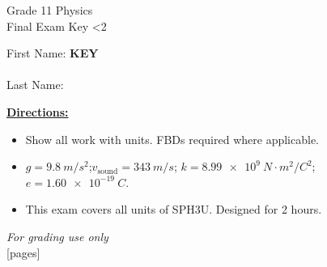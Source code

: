 \documentclass[addpoints]{exam}
\newcommand{\event}{Final Exam}
\newcommand{\tournament}{}
\def\type{0}
\begin{document}
\begin{center}
    {\huge Grade 11 Physics \\ \event
    \ifprintanswers \space Key
    \else \space \ifnum\type<2 \fi
    \fi \\ \vspace{3mm}\tournament\vspace{1mm}}
\end{center}

\vspace{.20\textheight}

\begin{center}
    First Name: \ifprintanswers
    \underline{\hspace{3.5cm}}\textbf{KEY}\underline{\hspace{5.5cm}}\\\vspace{5mm}
    \else \underline{\hspace{10cm}}\\ \vspace{5mm} \fi
    Last Name: \underline{\hspace{10cm}}\\ \vspace{5mm}
\end{center}

\noindent\textbf{\underline{Directions:}}
\begin{itemize}
    \item Show all work with units. FBDs required where applicable.
    \item $g = \SI{9.8}{m/s^2}$;\quad $v_\text{sound} = \SI{343}{m/s}$;\quad
    $k = \SI{8.99e9}{N\cdot m^2/C^2}$;\quad $e = \SI{1.60e-19}{C}$.
    \item This exam covers all units of SPH3U. Designed for 2 hours.
\end{itemize}
\begin{center}
\textit{For grading use only}\\
[pages]
\end{center}
\end{document}
